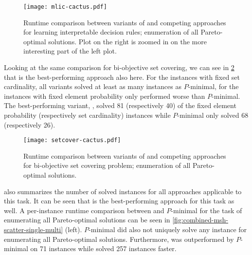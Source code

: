 \begin{figure}
  \centering
  \texttt{[image: mlic-cactus.pdf]}
  \caption{Runtime comparison between variants of \algname{} and competing approaches for learning interpretable decision rules;
    enumeration of all Pareto-optimal solutions.
    Plot on the right is zoomed in on the more interesting part of the left plot.
  }\label{fig:mlic-cactus-multi}
\end{figure}

Looking at the same comparison for bi-objective set covering, we can see in \cref{fig:setcover-cactus-multi} that \msh{} is the best-performing approach also here.
For the instances with fixed set cardinality, all \algname{} variants solved at least as many instances as $P$-minimal, for the instances with fixed element probability only \oll{} performed worse than $P$-minimal.
The best-performing variant, \msh{}, solved 81 (respectively 40) of the fixed element probability (respectively set cardinality) instances while $P$-minimal only solved 68 (respectively 26).

\begin{figure}
  \centering
  \texttt{[image: setcover-cactus.pdf]}
  \caption{Runtime comparison between variants of \algname{} and competing approaches for bi-objective set covering problem;
    enumeration of all Pareto-optimal solutions.
  }\label{fig:setcover-cactus-multi}
\end{figure}

 also summarizes the number of solved instances for all approaches applicable to this task.
It can be seen that \msh{} is the best-performing approach for this task as well.
A per-instance runtime comparison between \msh{} and $P$-minimal for the task of enumerating all Pareto-optimal solutions can be seen in \cref{fig:combined-msh-scatter-single-multi} (left).
$P$-minimal did also not uniquely solve any instance for enumerating all Pareto-optimal solutions.
Furthermore, \msh{} was outperformed by $P$-minimal on 71 instances while \msh{} solved 257 instances faster.

